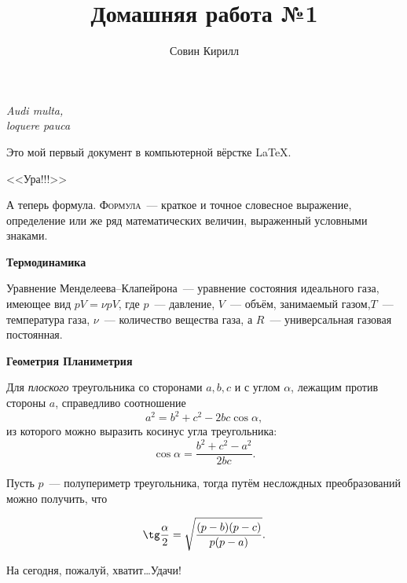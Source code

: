 \documentclass[12pt]{article}
\title{Домашняя работа №1}
\author{Совин Кирилл}
\date{}
\begin{document}
	\maketitle
	\begin{flushright}
		\textit{Audi multa,\\
			loquere pauca}	
	\end{flushright}

	\vspace{20pt}

	Это мой первый документ в компьютерной вёрстке \LaTeX.

	\begin{center}
		\huge{\textsf{<<Ура!!!>>} }\\
	\end{center}

	А теперь формула. \textsc{Формула}~--- краткое и точное словесное выражение, определение или же ряд математических величин, выраженный условными знаками.
	\vspace{15pt}

	\hspace{28pt}  {\Large\textbf{Термодинамика}}

	Уравнение Менделеева--Клапейрона~--- уравнение состояния идеального газа, имеющее вид $pV = \nu pV$, где $p$~--- давление, $V$~--- объём, занимаемый газом,$T$~--- температура газа, $\nu$~--- количество вещества газа, а $R$~--- универсальная газовая постоянная.
	\vspace{15pt}

	\hspace{28pt}  {\Large\textbf{Геометрия \hfill Планиметрия}}
	
	Для \textit{плоского} треугольника со сторонами $a, b, c$ и с углом $\alpha$, лежащим против стороны $a$, справедливо соотношение
	$$
	a^2 = b^2 + c^2 - 2bc \cos \alpha,
	$$
	из которого можно выразить косинус угла треугольника:
	$$
	\cos \alpha =\frac {b^2 + c^2 - a^2} {2bc}.
	$$

	Пусть $p$~--- полупериметр треугольника, тогда путём неслождных преобразований можно получить, что

	$$
	\tg \frac \alpha 2 = \sqrt{\frac {(p - b)(p - c)} {p(p - a)} }.
	$$

	\begin{flushleft}
		На сегодня, пожалуй, хватит\dots Удачи!
	\end{flushleft}
\end{document}
